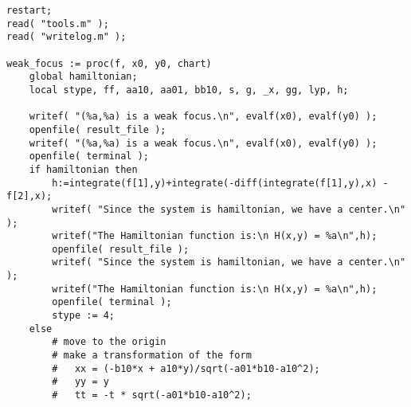 \documentclass[a4paper,10pt]{article}
\begin{document}
\begin{lstlisting}[name=weakfocus]
restart;
read( "tools.m" );
read( "writelog.m" );

weak_focus := proc(f, x0, y0, chart)
    global hamiltonian;
    local stype, ff, aa10, aa01, bb10, s, g, _x, gg, lyp, h;

    writef( "(%a,%a) is a weak focus.\n", evalf(x0), evalf(y0) );
    openfile( result_file );
    writef( "(%a,%a) is a weak focus.\n", evalf(x0), evalf(y0) );
    openfile( terminal );
    if hamiltonian then
        h:=integrate(f[1],y)+integrate(-diff(integrate(f[1],y),x) - f[2],x);
        writef( "Since the system is hamiltonian, we have a center.\n" );
        writef("The Hamiltonian function is:\n H(x,y) = %a\n",h);
        openfile( result_file );
        writef( "Since the system is hamiltonian, we have a center.\n" );
        writef("The Hamiltonian function is:\n H(x,y) = %a\n",h);
        openfile( terminal );
        stype := 4;
    else
        # move to the origin
        # make a transformation of the form
        #   xx = (-b10*x + a10*y)/sqrt(-a01*b10-a10^2);
        #   yy = y
        #   tt = -t * sqrt(-a01*b10-a10^2);


\end{lstlisting}
\end{document}

